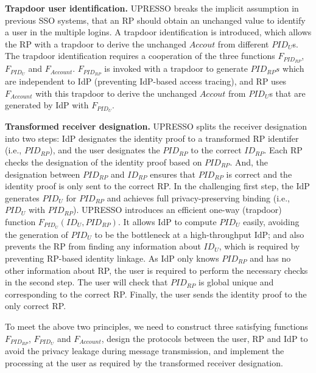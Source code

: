 \vspace{1mm}\noindent \textbf{Trapdoor user identification.} UPRESSO breaks the implicit assumption in previous SSO systems, that an RP should obtain an unchanged value to identify a user in the multiple logins.
A trapdoor identification is introduced, which allows the RP with a trapdoor to derive the unchanged $Accout$ from different $PID_{U}$s.
The trapdoor identification requires a cooperation of the three functions $F_{PID_{RP}}$, $F_{PID_{U}}$ and $F_{Account}$.
$F_{PID_{RP}}$  is invoked with a trapdoor to generate $PID_{RP}s$ which are independent to IdP (preventing IdP-based access tracing),
 and RP uses $F_{Account}$ with this trapdoor to derive the unchanged $Accout$  from $PID_{U}$s that are generated by IdP with $F_{PID_{U}}$.

\vspace{1mm}\noindent \textbf{Transformed receiver designation.}
UPRESSO splits the receiver designation into two steps: IdP designates the identity proof to a transformed RP identifer (i.e., $PID_{RP}$), and the user designates the $PID_{RP}$ to the correct $ID_{RP}$.
 Each RP checks the  designation of the identity proof based on $PID_{RP}$.
And, the designation between $PID_{RP}$ and $ID_{RP}$ ensures that $PID_{RP}$ is correct and the identity proof is only sent to the correct RP.
In the challenging first step, the IdP generates $PID_U$ for $PID_{RP}$ and achieves full privacy-preserving binding (i.e., $PID_U$ with $PID_{RP}$).
UPRESSO introduces an efficient one-way (trapdoor) function $F_{PID_{U}}(ID_U, PID_{RP})$.
 It allows IdP to  compute $PID_U$ easily,  avoiding the generation of $PID_U$ to be the bottleneck at a high-throughput IdP;
   and also prevents the RP from finding any information about $ID_U$, which is required by preventing RP-based identity linkage.
As IdP only knows $PID_{RP}$ and has no other information about RP, the user is required to perform the necessary checks  in the second step.
The user will check that $PID_{RP}$ is global unique and corresponding to the correct RP.
Finally, the user sends the identity proof  to the only correct RP.

To meet the above two principles, we need to construct three satisfying functions $F_{PID_{RP}}$, $F_{PID_{U}}$ and $F_{Account}$, design the protocols between the user, RP and IdP to avoid the privacy leakage during message transmission, and implement the  processing at the user as  required by the transformed receiver designation.










